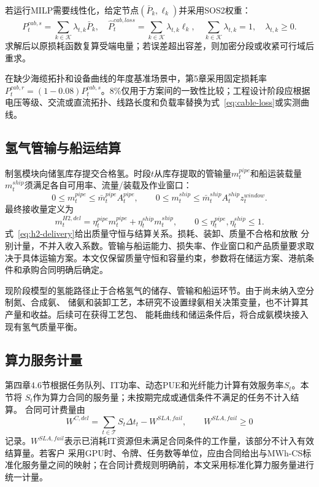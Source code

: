 若运行MILP需要线性化，给定节点$(\bar P_k,\ell_k)$并采用SOS2权重：
\begin{equation}
P_t^{cab,s}=\sum_{k\in\mathcal K}\lambda_{t,k}\bar P_k,
\quad
\widehat P_t^{cab,loss}=\sum_{k\in\mathcal K}\lambda_{t,k}\ell_k,
\quad
\sum_{k\in\mathcal K}\lambda_{t,k}=1,
\quad \lambda_{t,k}\ge0.
\label{eq:cable-loss-pwl}
\end{equation}
求解后以原损耗函数复算受端电量；若误差超出容差，则加密分段或收紧可行域后重求。

在缺少海缆拓扑和设备曲线的年度基准场景中，第5章采用固定损耗率
$P_t^{cab,r}=(1-0.08)P_t^{cab,s}$。8\%仅用于方案间的一致性比较；工程设计阶段应根据
电压等级、交流或直流拓扑、线路长度和负载率替换为式~\eqref{eq:cable-loss}或实测曲线。

\subsection{氢气管输与船运结算}

制氢模块向储氢库存提交合格氢。时段$t$从库存提取的管输量$m_t^{pipe}$和船运装载量
$m_t^{ship}$须满足各自可用率、流量/装载及作业窗口：
\begin{equation}
0\le m_t^{pipe}\le \bar m_t^{pipe}A_t^{pipe},
\qquad
0\le m_t^{ship}\le \bar m_t^{ship}A_t^{ship}z_t^{window}.
\label{eq:h2-channel-capacity}
\end{equation}
最终接收量定义为
\begin{equation}
m_t^{H2,del}
=\eta_t^{pipe}m_t^{pipe}+\eta_t^{ship}m_t^{ship},
\qquad 0\le\eta_t^{pipe},\eta_t^{ship}\le1.
\label{eq:h2-delivery}
\end{equation}
式~\eqref{eq:h2-delivery}给出质量守恒与结算关系。损耗、装卸、质量不合格和放散
分别计量，不并入收入系数。管输与船运能力、损失率、作业窗口和产品质量要求取决于具体运输方案。本文仅保留质量守恒和容量约束，参数将在储运方案、港航条件和承购合同明确后确定。

现阶段模型的氢能路径止于合格氢气的储存、管输和船运环节。由于尚未纳入空分制氮、合成氨、
储氨和装卸工艺，本研究不设置绿氨相关决策变量，也不计算其产量和收益。后续可在获得工艺包、
能耗曲线和储运条件后，将合成氨模块接入现有氢气质量平衡。

\subsection{算力服务计量}

第四章4.6节根据任务队列、IT功率、动态PUE和光纤能力计算有效服务率$S_t$。本节将
$S_t$作为算力合同的服务量；未按期完成或通信条件不满足的任务不计入结算。
合同可计费量由
\begin{equation}
W^{C,del}=\sum_{t\in\mathcal T} S_t\Delta t_t-W^{SLA,fail},
\qquad W^{SLA,fail}\ge0
\label{eq:compute-delivery}
\end{equation}
记录。$W^{SLA,fail}$表示已消耗IT资源但未满足合同条件的工作量，该部分不计入有效结算量。若客户
采用GPU时、令牌、任务数等单位，应由合同给出与MWh-CS标准化服务量之间的映射；在合同计费规则明确前，本文采用标准化算力服务量进行统一计量。

